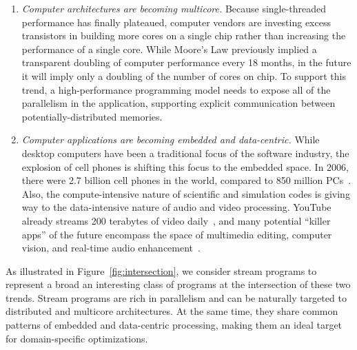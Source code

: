 

\begin{enumerate}

\item {\it Computer architectures are becoming multicore.}  Because
  single-threaded performance has finally plateaued, computer vendors
  are investing excess transistors in building more cores on a single
  chip rather than increasing the performance of a single core.  While
  Moore's Law previously implied a transparent doubling of computer
  performance every 18 months, in the future it will imply only a
  doubling of the number of cores on chip.  To support this trend, a
  high-performance programming model needs to expose all of the
  parallelism in the application, supporting explicit communication
  between potentially-distributed memories.

\item {\it Computer applications are becoming embedded and
  data-centric.}  While desktop computers have been a traditional
  focus of the software industry, the explosion of cell phones is
  shifting this focus to the embedded space.  In 2006, there were 2.7
  billion cell phones in the world, compared to 850 million
  PCs~\cite{TODO-ITU-and-find-2008-not-2006}.  Also, the
  compute-intensive nature of scientific and simulation codes is
  giving way to the data-intensive nature of audio and video
  processing.  YouTube already streams 200 terabytes of video
  daily~\cite{TODO-Wikipedia-youtube}, and many potential ``killer
  apps'' of the future encompass the space of multimedia editing,
  computer vision, and real-time audio
  enhancement~\cite{TODO-Berkeley-view,TODO-Intel-report}.

\end{enumerate}

As illustrated in Figure~\ref{fig:intersection}, we consider stream
programs to represent a broad an interesting class of programs at the
intersection of these two trends.  Stream programs are rich in
parallelism and can be naturally targeted to distributed and multicore
architectures.  At the same time, they share common patterns of
embedded and data-centric processing, making them an ideal target for
domain-specific optimizations.

